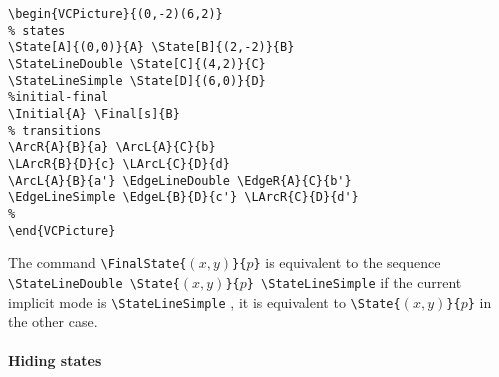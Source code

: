 \documentclass[11pt,twoside]{article}
\newlength{\parindenttemp} %
\newcommand{\noi}{\noindent}
\newlength{\jsIndent}%
\newlength{\ColSource}%
\newlength{\ColFigur}%
\begin{document}
\noi 
\hspace*{-\jsIndent}
\begin{minipage}[c]{\ColFigur}%
\par\vspace*{0mm}%
\begin{center}
%
\end{center}
\end{minipage}%
\hspace*{1.2em}%
\begin{minipage}[c]{\ColSource}
\setlength{\parindent}{\parindenttemp}%
\par\vspace*{0mm}%
\footnotesize
\begin{verbatim}
\begin{VCPicture}{(0,-2)(6,2)}
% states
\State[A]{(0,0)}{A} \State[B]{(2,-2)}{B}
\StateLineDouble \State[C]{(4,2)}{C}
\StateLineSimple \State[D]{(6,0)}{D}
%initial-final
\Initial{A} \Final[s]{B}
% transitions 
\ArcR{A}{B}{a} \ArcL{A}{C}{b}
\LArcR{B}{D}{c} \LArcL{C}{D}{d}
\ArcL{A}{B}{a'} \EdgeLineDouble \EdgeR{A}{C}{b'}
\EdgeLineSimple \EdgeL{B}{D}{c'} \LArcR{C}{D}{d'}
%
\end{VCPicture}
\end{verbatim}
\normalsize
\end{minipage}%

\noi
The command \verb+\FinalState{+$(x,y)$\verb+}{+$p$\verb+}+ is equivalent to
the sequence\\
\verb+\StateLineDouble \State{+$(x,y)$\verb+}{+$p$\verb+} \StateLineSimple+ 
if the current implicit mode is \verb+\StateLineSimple+ , 
it is equivalent to \verb+\State{+$(x,y)$\verb+}{+$p$\verb+}+ in the 
other case.


\paragraph{Hiding states}
~
\end{document}
